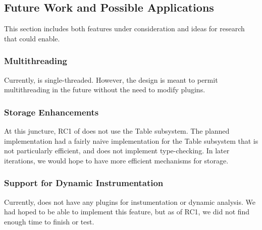 
\subsection{Future Work and Possible Applications}
This section includes both features under consideration and ideas for research that \mt{} could enable.

\subsubsection{Multithreading}
Currently, \mt{} is single-threaded. However, the design is meant to permit multithreading in the future without the need to modify plugins. 

\subsubsection{Storage Enhancements}
At this juncture, RC1 of \mt{} does not use the Table subsystem. The planned implementation had a fairly naive implementation for the Table subsystem that is not particularly efficient, and does not implement type-checking. In later iterations, we would hope to have more efficient mechanisms for storage.

\subsubsection{Support for Dynamic Instrumentation}
Currently, \mt{} does not have any plugins for instumentation or dynamic analysis. We had hoped to be able to implement this feature, but as of RC1, we did not find enough time to finish or test.

